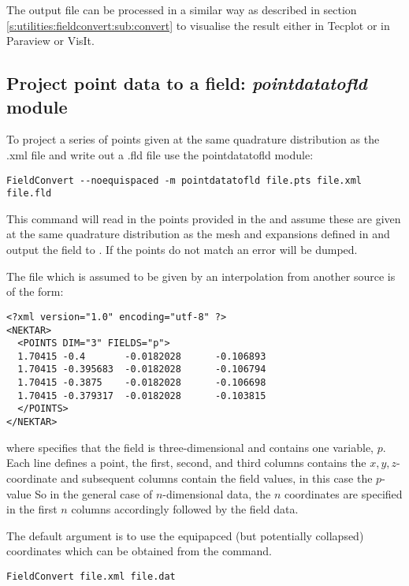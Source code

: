 The output file  can be processed in a similar 
way as described in section \ref{s:utilities:fieldconvert:sub:convert}
to visualise the result either in Tecplot or in Paraview or VisIt.
%
%
%

\subsection{ Project point data to a field: \textit{pointdatatofld} module}
\label{s:utilities:fieldconvert:sub:pointdatatofld}
To project a series of points given at the same quadrature distribution as the .xml file and write out a .fld file use the pointdatatofld module:
%
\begin{lstlisting}[style=BashInputStyle]
FieldConvert --noequispaced -m pointdatatofld file.pts file.xml file.fld
\end{lstlisting}
%
This command will read in the points provided in the 
and assume these are given at the same quadrature distribution as the
mesh and expansions defined in  and output the field
to . If the points do not match an error will be dumped. 


The file  which is assumed to be given by an interpolation from another source is of the form:
%
\begin{lstlisting}[style=XMLStyle]
<?xml version="1.0" encoding="utf-8" ?>
<NEKTAR>
  <POINTS DIM="3" FIELDS="p">
  1.70415 -0.4       -0.0182028      -0.106893
  1.70415 -0.395683  -0.0182028      -0.106794
  1.70415 -0.3875    -0.0182028      -0.106698
  1.70415 -0.379317  -0.0182028      -0.103815
  </POINTS>
</NEKTAR>
\end{lstlisting}
%
where  specifies that the field is
three-dimensional and contains one variable, $p$. Each line defines a
point, the first, second, and third columns contains the
$x,y,z$-coordinate and subsequent columns contain the field values, in
this case the $p$-value So in the general case of $n$-dimensional
data, the $n$ coordinates are specified in the first $n$ columns
accordingly followed by the field data. 

The default argument is to use the equipapced (but potentially
collapsed) coordinates which can  be obtained from the command.

\begin{lstlisting}[style=BashInputStyle]
FieldConvert file.xml file.dat
\end{lstlisting}

